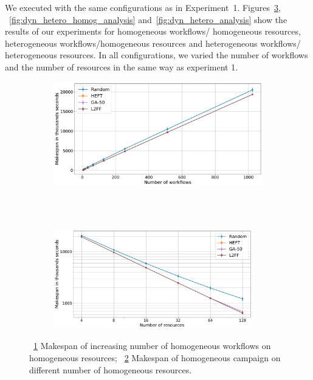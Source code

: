 We executed with the same configurations as in Experiment~1. 
Figures~\ref{fig:dyn_homog_analysis}, ~\ref{fig:dyn_hetero_homog_analysis} and~\ref{fig:dyn_hetero_analysis} show the results of our experiments for homogeneous workflows/ homogeneous resources, heterogeneous workflows/homogeneous resources and heterogeneous workflows/ heterogeneous resources.
In all configurations, we varied the number of workflows and the number of resources in the same way as experiment 1.

\begin{figure}[ht!]
    \centering
    \begin{subfigure}[b]{0.85\textwidth}
        \includegraphics[width=.95\textwidth]{figures/campaign/StHomoCampaigns_4DynHomoResources.pdf}
        \caption{}
        \label{fig:StHomoCampaigns_4DyHomoResources}
    \end{subfigure}\\
    ~ 
    \begin{subfigure}[b]{0.85\textwidth}
        \includegraphics[width=0.95\textwidth]{figures/campaign/DynHomoResources_StHomoCampaigns.pdf}
        \caption{}
        \label{fig:DyHomoResources_StHomoCampaigns}
    \end{subfigure}
    \caption{~\ref{fig:StHomoCampaigns_4DyHomoResources} Makespan of increasing number of homogeneous workflows on homogeneous resources;
        ~\ref{fig:DyHomoResources_StHomoCampaigns} Makespan of homogeneous campaign on different number of homogeneous resources.}
    \label{fig:dyn_homog_analysis}
\end{figure}

